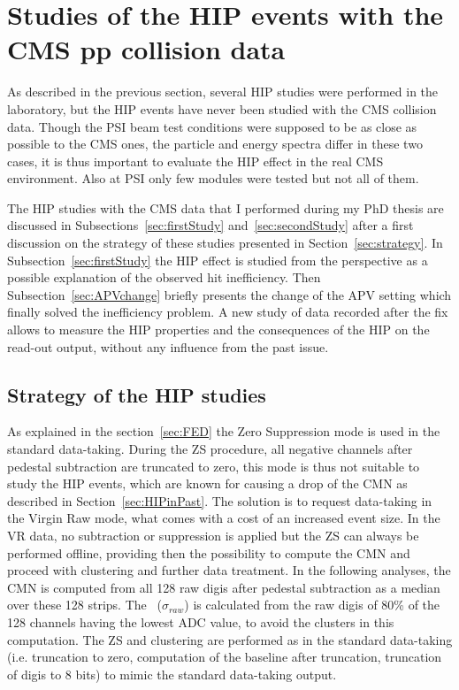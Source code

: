 
\section{Studies of the HIP events with the CMS pp collision data}

As described in the previous section, several HIP studies were performed in the laboratory, but the HIP events have never been studied with the CMS collision data. Though the PSI beam test conditions were supposed to be as close as possible to the CMS ones, the particle and energy spectra differ in these two cases, it is thus important to evaluate the HIP effect in the real CMS environment. Also at PSI only few modules were tested but not all of them. 

The HIP studies with the CMS data that I performed during my PhD thesis are discussed in Subsections~\ref{sec:firstStudy} and~\ref{sec:secondStudy} after a first discussion on the strategy of these studies presented in Section~\ref{sec:strategy}. In Subsection~\ref{sec:firstStudy} the HIP effect is studied from the perspective as a possible explanation of the observed hit inefficiency. Then Subsection~\ref{sec:APVchange} briefly presents the change of the APV setting which finally solved the inefficiency problem. A new study of data recorded after the fix allows to measure the HIP properties and the consequences of the HIP on the read-out output,  without any influence from the past issue.

\subsection{Strategy of the HIP studies~\label{sec:strategy}}

As explained in the section~\ref{sec:FED} the Zero Suppression mode is used in the standard data-taking. During the ZS procedure, all negative channels after pedestal subtraction are truncated to zero, this mode is thus not suitable to study the HIP events, which are known for causing a drop of the CMN as described in Section~\ref{sec:HIPinPast}. The solution is to request data-taking in the Virgin Raw mode, what comes with a cost of an increased event size. In the VR data, no subtraction or suppression is applied but the ZS can always be performed offline, providing then the possibility to compute the CMN and proceed with clustering and further data treatment. In the following analyses, the CMN is computed from all 128 raw digis after pedestal subtraction as a median over these 128 strips. The \SD~($\sigma_{raw}$) is calculated from the raw digis of 80\% of the 128 channels having the lowest ADC value, to avoid the clusters in this computation. The ZS and clustering are performed as in the standard data-taking (i.e. truncation to zero, computation of the baseline after truncation, truncation of digis to 8 bits) to mimic the standard data-taking output.

